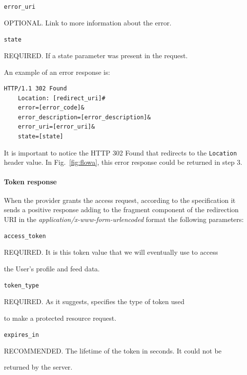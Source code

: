 \documentclass[a4paper,12pt]{article}
\def\myfig#1{Fig.~#1\xspace}
\begin{document}
\texttt{error\_uri}

\hspace{0.5cm}OPTIONAL. Link to more information about the error.

\texttt{state}

\hspace{0.5cm}REQUIRED. If a state parameter was present in the request.

\vspace{0.5cm}

\noindent An example of an error response is:

\begin{lstlisting}[basicstyle=\ttfamily]
  HTTP/1.1 302 Found
    Location: [redirect_uri]#
    error=[error_code]&
    error_description=[error_description]&
    error_uri=[error_uri]&
    state=[state]
\end{lstlisting}

It is important to notice the HTTP 302 Found that redirects to the \texttt{Location} header value. In \myfig{\ref{fig:flowa}}, this error response could be returned in step 3.

\paragraph{Token response}
When the provider grants the access request, according to the specification it sends a positive response adding to the fragment component of the redirection URI in the \textit{application/x-www-form-urlencoded} format the following parameters:

\texttt{access\_token}

\hspace{0.5cm}REQUIRED. It is this token value that we will eventually use to access

\hspace{0.5cm}the User's profile and feed data.

\texttt{token\_type}

\hspace{0.5cm}REQUIRED. As it suggests, specifies the type of token used

\hspace{0.5cm}to make a protected resource request.

\texttt{expires\_in}

\hspace{0.5cm}RECOMMENDED. The lifetime of the token in seconds. It could not be

\hspace{0.5cm}returned by the server.
\end{document}
